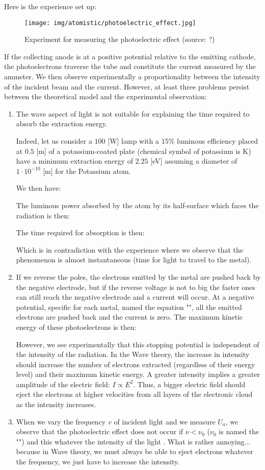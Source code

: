 	Here is the experience set up:
	\begin{figure}[H]
		\centering
		\texttt{[image: img/atomistic/photoelectric\_effect.jpg]}
		\caption{Experiment for measuring the photoelectric effect (source: ?)}
	\end{figure}
	If the collecting anode is at a positive potential relative to the emitting cathode, the photoelectrons traverse the tube and constitute the current measured by the ammeter. We then observe experimentally a proportionality between the intensity of the incident beam and the current.
	However, at least three problems persist between the theoretical model and the experimental observation:
	\begin{enumerate}
		\item The wave aspect of light is not suitable for explaining the time required to absorb the extraction energy.

		Indeed, let us consider a $100$ [W] lamp with a $15\%$ luminous efficiency placed at $0.5$ [m] of a potassium-coated plate (chemical symbol of potassium is $\mathrm{K}$) have a minimum extraction energy of $2.25$ [eV] assuming a diameter of $1\cdot 10^{-10}$ [m] for the Potassium atom.
		
		We then have:
		
		The luminous power absorbed by the atom by its half-surface which faces the radiation is then:
		
		The time required for absorption is then:
		
		Which is in contradiction with the experience where we observe that the phenomenon is almost instantaneous (time for light to travel to the metal).
		
		\item If we reverse the poles, the electrons emitted by the metal are pushed back by the negative electrode, but if the reverse voltage is not to big the faster ones can still reach the negative electrode and a current will occur. At a negative potential, specific for each metal, named the equation "", all the emitted electrons are pushed back and the current is zero. The maximum kinetic energy of these photoelectrons is then:
		
		However, we see experimentally that this stopping potential is independent of the intensity of the radiation. In the Wave theory, the increase in intensity should increase the number of electrons extracted (regardless of their energy level) and their maximum kinetic energy. A greater intensity implies a greater amplitude of the electric field: $I \propto E^2$. Thus, a bigger electric field should eject the electrons at higher velocities from all layers of the electronic cloud as the intensity increases.
		
		\item When we vary the frequency $v$ of incident light and we measure $U_a$, we observe that the photoelectric effect does not occur if $\nu<\nu_0$ ($\nu_0$ is named the "") and this whatever the intensity of the light . What is rather annoying... because in Wave theory, we must always be able to eject electrons whatever the frequency, we just have to increase the intensity.
	\end{enumerate}
